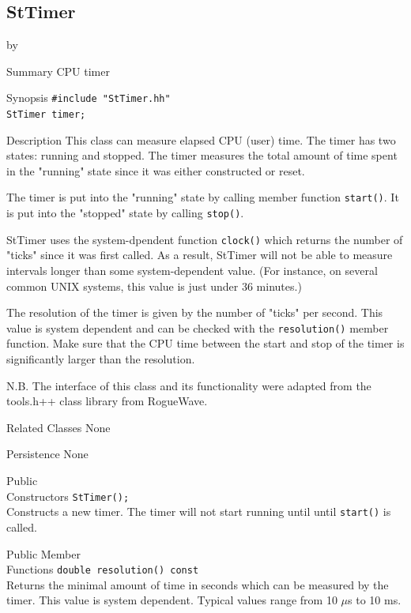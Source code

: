 \documentclass[twoside]{article}
\newcommand{\comp}[1]{\texttt{#1}}%
\newcommand{\entrylabel}[1]{\mbox{\textbf{{#1}}}\hfil}%
\newenvironment{entry}
{\begin{list}{}%
    {\renewcommand{\makelabel}{\entrylabel}%
     \setlength{\labelwidth}{90pt}%
     \setlength{\leftmargin}{\labelwidth}
     \advance\leftmargin by \labelsep%
      }%
    }%
  {\end{list}}
\newcommand{\Entrylabel}[1]%
{\raisebox{0pt}[1ex][0pt]{\makebox[\labelwidth][l]%
    {\parbox[t]{\labelwidth}{\hspace{0pt}\textbf{{#1}}}}}}
\newenvironment{Entry}%
{\renewcommand{\entrylabel}{\Entrylabel}\begin{entry}}%
  {\end{entry}}
\begin{document}
\subsection{StTimer }
\begin{Entry}
\item[Summary]
    CPU timer
    
\item[Synopsis]
    \verb+#include "StTimer.hh"+ \\
    \verb+StTimer timer;+
    
\item[Description]    
    This class can measure elapsed CPU (user) time. The timer has two
    states: running and stopped. The timer measures the total amount
    of time spent in the "running" state since it was either
    constructed or reset.
    
    The timer is put into the "running" state by calling member
    function \comp{start()}. It is put into the "stopped" state by
    calling \comp{stop()}.
    
    StTimer uses the system-dpendent function \comp{clock()} which
    returns the number of "ticks" since it was first called. As a
    result, StTimer will not be able to measure intervals longer than
    some system-dependent value. (For instance, on several common UNIX
    systems, this value is just under 36 minutes.)
    
    The resolution of the timer is given by the number of "ticks" per
    second.  This value is system dependent and can be checked with
    the \comp{resolution()} member function. Make sure that the CPU time
    between the start and stop of the timer is significantly larger
    than the resolution.

    N.B. The interface of this class and its functionality were adapted
    from the tools.h++ class library from RogueWave.
    
\item[Related Classes]
    None
    
\item[Persistence]
    None
    
\item[Public\\ Constructors]
    \verb+StTimer();+ \\
    Constructs a new timer. The timer will not start
    running until until \comp{start()} is called.

\item[Public Member\\ Functions]
    \verb+double resolution() const+\\
    Returns the minimal amount of time in seconds which can be
    measured by the timer. This value is system dependent.
    Typical values range from 10 $\mu$s to 10 ms.
    

\end{Entry}
\end{document}

